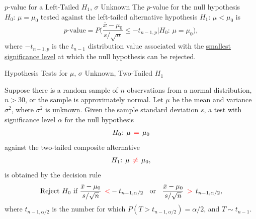 \documentclass[pdf]{beamer}
\theoremstyle{remark}
\theoremstyle{definition}
\begin{document}
\begin{frame}[t]{$p$-value  for a Left-Tailed $H_1$, $\sigma$ Unknown}
The $p$-value for the null hypothesis $H_0\text{: }  \mu = \mu_0$ tested against the left-tailed alternative hypothesis $H_1\text{: }  \mu < \mu_0$ is \\
\vspace{1.5ex}
\begin{equation}
p\text{-value} = P\bigg( \frac{\bar{x} - \mu_0}{s/ \sqrt{n}} \leq -t_{n-1,p} | H_0\text{: }  \mu = \mu_0 \bigg),
\end{equation}
where $-t_{n-1,p}$ is the $t_{n-1}$ distribution value associated with the \underline{smallest significance level} at which the null hypothesis can be rejected. \\
\end{frame}

\begin{frame}[t]{Hypothesis Tests for $\mu$, $\sigma$ Unknown, Two-Tailed $H_1$}
\small
\begin{tcolorbox}[colback=white!5,colframe=franklinblue]%
Suppose there is a random sample of $n$ observations from a normal distribution, $n > 30$, or the sample is approximately normal.  Let $\mu$ be the mean and variance $\sigma^2$, where $\sigma^2$ is \underline{unknown}. Given the sample standard deviation $s$, a test with significance level $\alpha$ for the null hypothesis 
\vspace{-1.0ex}
\begin{align*} 
H_0\text{: }  \mu \;\, \textcolor{red}{=} \;\, \mu_0  
\end{align*} 
\vspace{-1.0ex}
against the two-tailed composite alternative 
\vspace{0.0ex}
\begin{align*} 
H_1\text{: }  \mu \;\, \textcolor{red}{\neq} \;\, \mu_0, 
\end{align*} 
\vspace{-1.0ex}
is obtained by the decision rule 
\vspace{0.0ex}
\begin{equation} 
\text{Reject } H_0 \text{ if } \frac{\bar{x} - \mu_0}{s/ \sqrt{n}} \;\, \textcolor{red}{<} -t_{n-1,\alpha/2} \;\; \text{ or } \;\;
\frac{\bar{x} - \mu_0}{s/ \sqrt{n}} \;\, \textcolor{red}{>} \;\, t_{n-1,\alpha/2},
\end{equation} 
where $t_{n-1,\alpha/2}$ is the number for which $P(T > t_{n-1,\alpha/2}) = \alpha/2$, and $T \sim t_{n-1}$. 
\end{tcolorbox}
\end{frame}
\end{document}
